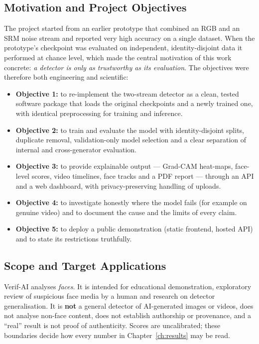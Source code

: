 \subsection{Motivation and Project Objectives}
The project started from an earlier prototype that combined an RGB and an SRM noise stream and reported very high accuracy on a single
dataset. When the prototype's checkpoint was evaluated on independent, identity-disjoint data it performed at chance level, which made the
central motivation of this work concrete: \emph{a detector is only as trustworthy as its evaluation}. The objectives were therefore both
engineering and scientific:

\begin{itemize}
\item \textbf{Objective 1:} to re-implement the two-stream detector as a clean, tested software package that loads the original
checkpoints and a newly trained one, with identical preprocessing for training and inference.
\item \textbf{Objective 2:} to train and evaluate the model with identity-disjoint splits, duplicate removal, validation-only model
selection and a clear separation of internal and cross-generator evaluation.
\item \textbf{Objective 3:} to provide explainable output --- Grad-CAM heat-maps, face-level scores, video timelines, face tracks and a PDF report --- through an
API and a web dashboard, with privacy-preserving handling of uploads.
\item \textbf{Objective 4:} to investigate honestly where the model fails (for example on genuine video) and to document the cause and the
limits of every claim.
\item \textbf{Objective 5:} to deploy a public demonstration (static frontend, hosted API) and to state its restrictions truthfully.
\end{itemize}

\subsection{Scope and Target Applications}
Verif-AI analyses \emph{faces}. It is intended for educational demonstration, exploratory review of suspicious face media by a human and
research on detector generalisation. It is \textbf{not} a general detector of AI-generated images or videos, does not analyse non-face content,
does not establish authorship or provenance, and a ``real'' result is not proof of authenticity. Scores are uncalibrated; these boundaries decide how
every number in Chapter~\ref{ch:results} may be read.

